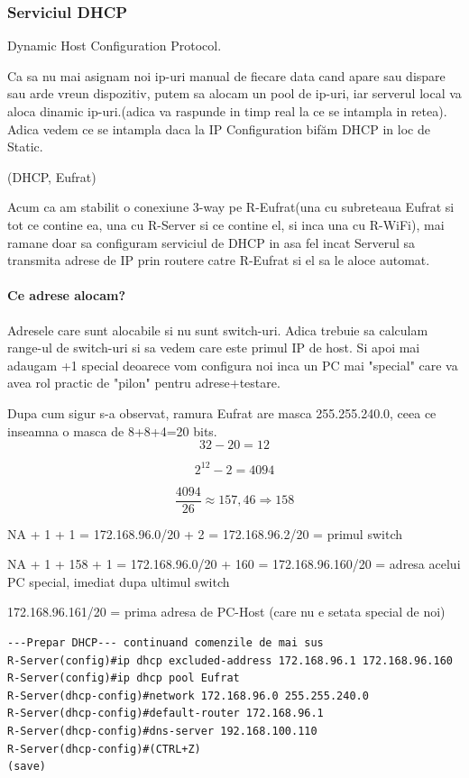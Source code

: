 \documentclass{article}
\begin{document}
\subsubsection{Serviciul DHCP}
Dynamic Host Configuration Protocol.

Ca sa nu mai asignam noi ip-uri manual de fiecare data cand apare sau dispare sau arde vreun dispozitiv, putem sa alocam un pool de ip-uri, iar serverul local va aloca dinamic ip-uri.(adica va raspunde in timp real la ce se intampla in retea). Adica vedem ce se intampla daca la IP Configuration bifăm DHCP in loc de Static.

(DHCP, Eufrat)


Acum ca am stabilit o conexiune 3-way pe R-Eufrat(una cu subreteaua Eufrat si tot ce contine ea, una cu R-Server si ce contine el, si inca una cu R-WiFi), mai ramane doar sa configuram serviciul de DHCP in asa fel incat Serverul sa transmita adrese de IP prin routere catre R-Eufrat si el sa le aloce automat.


\paragraph{Ce adrese alocam?}

Adresele care sunt alocabile si nu sunt switch-uri. Adica trebuie sa calculam range-ul de switch-uri si sa vedem care este primul IP de host. Si apoi mai adaugam +1 special deoarece vom configura noi inca un PC mai "special" care va avea rol practic de "pilon" pentru adrese+testare.

Dupa cum sigur s-a observat, ramura Eufrat are masca 255.255.240.0, ceea ce inseamna o masca de 8+8+4=20 bits.
\[32-20 = 12\]

\[2^{12}-2=4094\]

\[\frac{4094}{26} \approx 157,46 \Rightarrow 158 \]

NA + 1 + 1 =  172.168.96.0/20 + 2 =  172.168.96.2/20 = primul switch

NA + 1 + 158 + 1 = 172.168.96.0/20 + 160 = 172.168.96.160/20 = adresa acelui PC special, imediat dupa ultimul switch

172.168.96.161/20 = prima adresa de PC-Host (care nu e setata special de noi)




\begin{verbatim}
---Prepar DHCP--- continuand comenzile de mai sus
R-Server(config)#ip dhcp excluded-address 172.168.96.1 172.168.96.160
R-Server(config)#ip dhcp pool Eufrat
R-Server(dhcp-config)#network 172.168.96.0 255.255.240.0
R-Server(dhcp-config)#default-router 172.168.96.1
R-Server(dhcp-config)#dns-server 192.168.100.110
R-Server(dhcp-config)#(CTRL+Z)
(save)
\end{verbatim}
\end{document}
